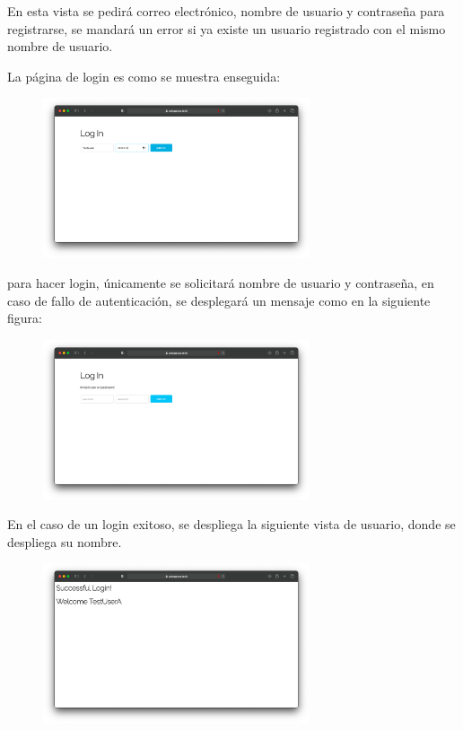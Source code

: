 \documentclass{article}
\begin{document}
\begin{enumerate}
\begin{itemize}
        En esta vista se pedirá correo electrónico, nombre de usuario y
        contraseña para registrarse, se mandará un error si ya existe un usuario
        registrado con el mismo nombre de usuario.

        La página de login es como se muestra enseguida:

        \begin{figure}[H]
            \centering
            \includegraphics[width=0.70\textwidth]{AppServer/z3}
        \end{figure}

        para hacer login, únicamente se solicitará nombre de usuario y
        contraseña, en caso de fallo de autenticación, se desplegará un mensaje
        como en la siguiente figura:

        \begin{figure}[H]
            \centering
            \includegraphics[width=0.70\textwidth]{AppServer/z4}
        \end{figure}

        En el caso de un login exitoso, se despliega la siguiente vista de
        usuario, donde se despliega su nombre.


        \begin{figure}[H]
            \centering
            \includegraphics[width=0.70\textwidth]{AppServer/z5}
        \end{figure}



\end{itemize}
\end{enumerate}
\end{document}
